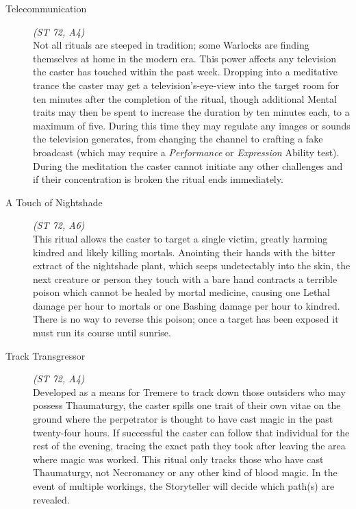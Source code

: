 \begin{description}
	\item[Telecommunication] \emph{(ST 72, A4)} \hfill \\
	Not all rituals are steeped in tradition; some Warlocks are finding themselves at home in the modern era.  This power affects any 
	television the caster has touched within the past week.  Dropping into a meditative trance the caster may get a television's-eye-view 
	into the target room for ten minutes after the completion of the ritual, though additional Mental traits may then be spent to increase 
	the duration by ten minutes each, to a maximum of five.  During this time they may regulate any images or sounds the television generates, 
	from changing the channel to crafting a fake broadcast (which may require a \emph{Performance} or \emph{Expression} Ability test).  
	During the meditation the caster cannot initiate any other challenges and if their concentration is broken the ritual ends immediately. \\

	\item[A Touch of Nightshade] \emph{(ST 72, A6)} \hfill \\
	This ritual allows the caster to target a single victim, greatly harming kindred and likely killing mortals.  Anointing their hands 
	with the bitter extract of the nightshade plant, which seeps undetectably into the skin, the next creature or person they touch with 
	a bare hand contracts a terrible poison which cannot be healed by mortal medicine, causing one Lethal damage per hour to mortals or 
	one Bashing damage per hour to kindred.  There is no way to reverse this poison; once a target has been exposed it must run its 
	course until sunrise. \\

	\item[Track Transgressor] \emph{(ST 72, A4)} \hfill \\
	Developed as a means for Tremere to track down those outsiders who may possess Thaumaturgy, the caster spills one trait of their 
	own vitae on the ground where the perpetrator is thought to have cast magic in the past twenty-four hours.  If successful the 
	caster can follow that individual for the rest of the evening, tracing the exact path they took after leaving the area where magic 
	was worked.  This ritual only tracks those who have cast Thaumaturgy, not Necromancy or any other kind of blood magic.  In the 
	event of multiple workings, the Storyteller will decide which path(s) are revealed. \\


\end{description}
